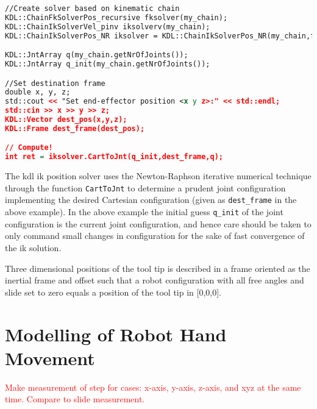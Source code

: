 \begin{lstlisting}[language=xml]
//Create solver based on kinematic chain
KDL::ChainFkSolverPos_recursive fksolver(my_chain);
KDL::ChainIkSolverVel_pinv iksolverv(my_chain);
KDL::ChainIkSolverPos_NR iksolver = KDL::ChainIkSolverPos_NR(my_chain,fksolver,iksolverv,100,1e-6);

KDL::JntArray q(my_chain.getNrOfJoints());
KDL::JntArray q_init(my_chain.getNrOfJoints());

//Set destination frame
double x, y, z;
std::cout << "Set end-effector position <x y z>:" << std::endl;
std::cin >> x >> y >> z;
KDL::Vector dest_pos(x,y,z);
KDL::Frame dest_frame(dest_pos);

// Compute!
int ret = iksolver.CartToJnt(q_init,dest_frame,q);
\end{lstlisting}

The \gls{kdl} \gls{ik} position solver uses the Newton-Raphson iterative numerical technique through the function \texttt{CartToJnt} to determine a prudent joint configuration implementing the desired Cartesian configuration (given as \texttt{dest\_frame} in the above example). In the above example the initial guess \texttt{q\_init} of the joint configuration is the current joint configuration, and hence care should be taken to only command small changes in configuration for the sake of fast convergence of the \gls{ik} solution.


Three dimensional positions of the tool tip is described in a frame oriented as the inertial frame and offset such that a robot configuration with all free angles and slide set to zero equals a position of the tool tip in [0,0,0].




\section{Modelling of Robot Hand Movement}
\textcolor{red}{Make measurement of step for cases: x-axis, y-axis, z-axis, and xyz at the same time. Compare to slide measurement.}

